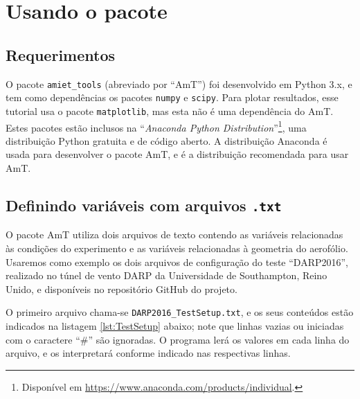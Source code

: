 \documentclass[a4paper, 11pt, twoside]{article}
\begin{document}
\section{Usando o pacote}

\subsection{Requerimentos}

O pacote \verb|amiet_tools| (abreviado por ``AmT'') foi desenvolvido em Python 3.x, e tem como dependências os pacotes \verb|numpy| e \verb|scipy|. Para plotar resultados, esse tutorial usa o pacote \verb|matplotlib|, mas esta não é uma dependência do AmT. Estes pacotes estão inclusos na ``\emph{Anaconda Python Distribution}''\footnote{Disponível em \url{https://www.anaconda.com/products/individual}.}, uma distribuição Python gratuita e de código aberto. A distribuição Anaconda é usada para desenvolver o pacote AmT, e é a distribuição recomendada para usar AmT.


\subsection{Definindo variáveis com arquivos \texttt{.txt}}

O pacote AmT utiliza dois arquivos de texto contendo as variáveis relacionadas às condições do experimento e as variáveis relacionadas à geometria do aerofólio. Usaremos como exemplo os dois arquivos de configuração do teste ``DARP2016'', realizado no túnel de vento DARP da Universidade de Southampton, Reino Unido, e disponíveis no repositório GitHub do projeto.

O primeiro arquivo chama-se \verb|DARP2016_TestSetup.txt|, e os seus conteúdos estão indicados na listagem \ref{lst:TestSetup} abaixo; note que linhas vazias ou iniciadas com o caractere ``\#'' são ignoradas. O programa lerá os valores em cada linha do arquivo, e os interpretará conforme indicado nas respectivas linhas.
\end{document}
